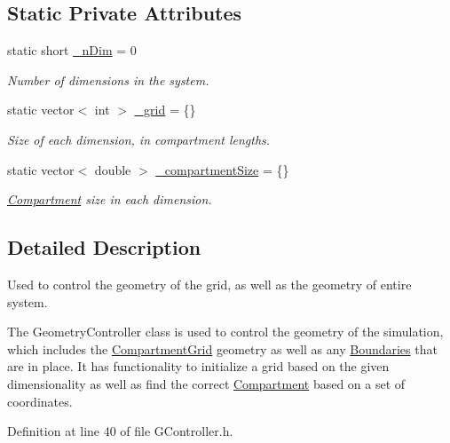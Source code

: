 \subsection*{Static Private Attributes}
\begin{DoxyCompactItemize}
\item 
static short \hyperlink{classGController_af3276bac24eb8b3b1bca31007b941c0f}{\+\_\+n\+Dim} = 0
\begin{DoxyCompactList}\small\item\em Number of dimensions in the system. \end{DoxyCompactList}\item 
static vector$<$ int $>$ \hyperlink{classGController_a2134b6522abe94d25206060b9684d265}{\+\_\+grid} = \{\}
\begin{DoxyCompactList}\small\item\em Size of each dimension, in compartment lengths. \end{DoxyCompactList}\item 
static vector$<$ double $>$ \hyperlink{classGController_a26bdd8b8d1667decda74bedf7bf25800}{\+\_\+compartment\+Size} = \{\}
\begin{DoxyCompactList}\small\item\em \hyperlink{classCompartment}{Compartment} size in each dimension. \end{DoxyCompactList}\end{DoxyCompactItemize}


\subsection{Detailed Description}
Used to control the geometry of the grid, as well as the geometry of entire system. 

The Geometry\+Controller class is used to control the geometry of the simulation, which includes the \hyperlink{classCompartmentGrid}{Compartment\+Grid} geometry as well as any \hyperlink{classBoundary}{Boundaries} that are in place. It has functionality to initialize a grid based on the given dimensionality as well as find the correct \hyperlink{classCompartment}{Compartment} based on a set of coordinates. 

Definition at line 40 of file G\+Controller.\+h.



